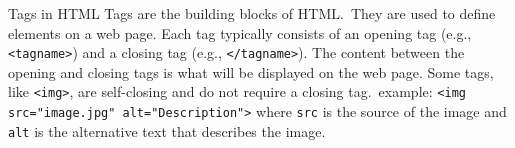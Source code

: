 \begin{concept}{Tags in HTML}
Tags are the building blocks of HTML.\ They are used to define elements on a web page. Each tag typically consists of an opening tag (e.g., \texttt{<tagname>}) and a closing tag (e.g., \texttt{</tagname>}). The content between the opening and closing tags is what will be displayed on the web page. Some tags, like \texttt{<img>}, are self-closing and do not require a closing tag.\ example: \texttt{<img src="image.jpg" alt="Description">} where \texttt{src} is the source of the image and \texttt{alt} is the alternative text that describes the image. %
\end{concept}
